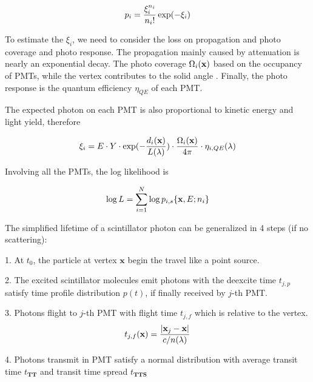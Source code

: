 \documentclass{article}
\begin{document}
	\begin{equation}
	\numberwithin{equation}{section}
	p_i = \frac{\xi_i^{n_i}}{n_i!} \exp(-\xi_i)
	\end{equation}
	
	\par To estimate the $\xi_i$, we need to consider the loss on propagation and photo coverage and photo response. The propagation mainly caused by attenuation is nearly an exponential decay. The photo coverage $\Omega_i(\textbf x)$ based on the occupancy of PMTs, while the vertex contributes to the solid angle . Finally, the photo response is the quantum efficiency $\eta_{QE}$ of each PMT.
	
	\par The expected photon on each PMT is also proportional to kinetic energy and light yield, therefore
	
	\begin{equation}
	\numberwithin{equation}{section}
	\xi_i = E\cdot Y\cdot \exp(-\frac{d_i({\textbf x})}{L(\lambda)}) \cdot \frac{\Omega_i({\textbf x})}{4\pi} \cdot\eta_{i,QE}(\lambda)
	\end{equation}

	\par Involving all the PMTs, the log likelihood is
	
	\begin{equation}
	\numberwithin{equation}{section}
	\log L = \sum_{i=1}^N \log p_{i,s} \{{\textbf x},E;n_{i}\}
	\end{equation}

	\par The simplified lifetime of a scintillator photon can be generalized in 4 steps (if no scattering): 
	\par 1. At $t_0$, the particle at vertex $\textbf {x}$ begin the travel like a point source. 
	\par 2. The excited scintillator molecules emit photons with the deexcite time $t_{j,p}$ satisfy time profile distribution $p(t)$, if finally received by $j$-th PMT.
	\par 3. Photons flight to $j$-th PMT with flight time $t_{j,f}$ which is relative to the vertex.
	\begin{equation}
		\numberwithin{equation}{section}
		t_{j,f}(\textbf x)=\frac{{|\textbf x_j}-{\textbf x|}}{c/n(\lambda)}
	\end{equation}
	
	\par 4. Photons transmit in PMT satisfy a normal distribution with average transit time $t_{\textbf{TT}}$ and transit time spread $t_{\textbf{TTS}}$
\end{document}
